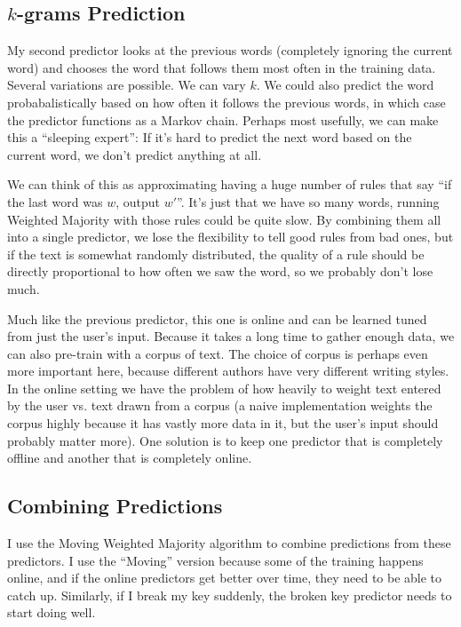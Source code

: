 \documentclass[12pt]{article}
\begin{document}
\subsection{$k$-grams Prediction}
My second predictor looks at the previous words (completely ignoring
the current word) and chooses the word that follows them most often in
the training data. Several variations are possible. We can vary
$k$. We could also predict the word probabalistically based on how
often it follows the previous words, in which case the predictor
functions as a Markov chain. Perhaps most usefully, we can make this a
``sleeping expert'': If it's hard to predict the next word based on
the current word, we don't predict anything at all.

We can think of this as approximating having a huge number of rules
that say ``if the last word was $w$, output $w'$''. It's just that we
have so many words, running Weighted Majority with those rules could
be quite slow. By combining them all into a single predictor, we lose
the flexibility to tell good rules from bad ones, but if the text is
somewhat randomly distributed, the quality of a rule should be
directly proportional to how often we saw the word, so we probably
don't lose much.

Much like the previous predictor, this one is online and can be
learned tuned from just the user's input. Because it takes a long time
to gather enough data, we can also pre-train with a corpus of
text. The choice of corpus is perhaps even more important here,
because different authors have very different writing styles. In the
online setting we have the problem of how heavily to weight text
entered by the user vs. text drawn from a corpus (a naive
implementation weights the corpus highly because it has vastly more
data in it, but the user's input should probably matter more). One
solution is to keep one predictor that is completely offline and
another that is completely online.

\subsection{Combining Predictions}
I use the Moving Weighted Majority algorithm to combine predictions
from these predictors. I use the ``Moving'' version because some of
the training happens online, and if the online predictors get better
over time, they need to be able to catch up. Similarly, if I break my
key suddenly, the broken key predictor needs to start doing well.
\end{document}
